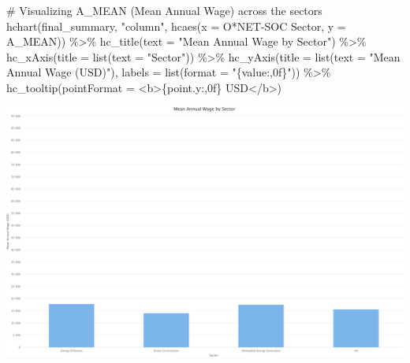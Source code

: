 \documentclass[
  letterpaper,
  DIV=11,
  numbers=noendperiod]{scrartcl}
\newenvironment{Shaded}{\begin{snugshade}}{\end{snugshade}}
\newcommand{\AttributeTok}[1]{\textcolor[rgb]{0.40,0.45,0.13}{#1}}
\newcommand{\CommentTok}[1]{\textcolor[rgb]{0.37,0.37,0.37}{#1}}
\newcommand{\FunctionTok}[1]{\textcolor[rgb]{0.28,0.35,0.67}{#1}}
\newcommand{\NormalTok}[1]{\textcolor[rgb]{0.00,0.23,0.31}{#1}}
\newcommand{\SpecialCharTok}[1]{\textcolor[rgb]{0.37,0.37,0.37}{#1}}
\newcommand{\StringTok}[1]{\textcolor[rgb]{0.13,0.47,0.30}{#1}}
\begin{document}
\begin{Shaded}
\begin{Highlighting}[]
\CommentTok{\# Visualizing A\_MEAN (Mean Annual Wage) across the sectors}
\FunctionTok{hchart}\NormalTok{(final\_summary, }\StringTok{"column"}\NormalTok{, }\FunctionTok{hcaes}\NormalTok{(}\AttributeTok{x =} \StringTok{\textasciigrave{}}\AttributeTok{O*NET{-}SOC Sector}\StringTok{\textasciigrave{}}\NormalTok{, }\AttributeTok{y =}\NormalTok{ A\_MEAN)) }\SpecialCharTok{\%\textgreater{}\%}
  \FunctionTok{hc\_title}\NormalTok{(}\AttributeTok{text =} \StringTok{"Mean Annual Wage by Sector"}\NormalTok{) }\SpecialCharTok{\%\textgreater{}\%}
  \FunctionTok{hc\_xAxis}\NormalTok{(}\AttributeTok{title =} \FunctionTok{list}\NormalTok{(}\AttributeTok{text =} \StringTok{"Sector"}\NormalTok{)) }\SpecialCharTok{\%\textgreater{}\%}
  \FunctionTok{hc\_yAxis}\NormalTok{(}\AttributeTok{title =} \FunctionTok{list}\NormalTok{(}\AttributeTok{text =} \StringTok{"Mean Annual Wage (USD)"}\NormalTok{), }\AttributeTok{labels =} \FunctionTok{list}\NormalTok{(}\AttributeTok{format =} \StringTok{"\{value:,0f\}"}\NormalTok{)) }\SpecialCharTok{\%\textgreater{}\%}
  \FunctionTok{hc\_tooltip}\NormalTok{(}\AttributeTok{pointFormat =} \StringTok{\textquotesingle{}\textless{}b\textgreater{}\{point.y:,0f\} USD\textless{}/b\textgreater{}\textquotesingle{}}\NormalTok{)}
\end{Highlighting}
\end{Shaded}

\includegraphics{index_files/figure-pdf/unnamed-chunk-13-3.pdf}
\end{document}
